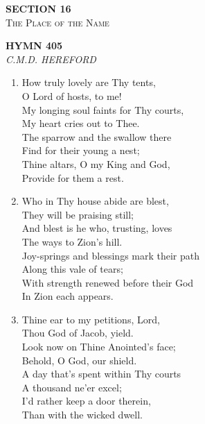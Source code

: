 \newpage
\thispagestyle{empty}
\vspace*{3.5cm}
\begin{center}
    {\LARGE \textbf{SECTION 16}}\\[0.8em]
    {\Large \textsc{The Place of the Name}}
\end{center}
\vspace{3.5cm}

\newpage
\begin{center}
    {\Large \textbf{HYMN 405}}
    \\
    \textit{C.M.D. HEREFORD}
\end{center}
\vspace{1em}

\begin{enumerate}
    \item How truly lovely are Thy tents, \\
        O Lord of hosts, to me! \\
        My longing soul faints for Thy courts, \\
        My heart cries out to Thee. \\
        The sparrow and the swallow there \\
        Find for their young a nest; \\
        Thine altars, O my King and God, \\
        Provide for them a rest.

    \item Who in Thy house abide are blest, \\
        They will be praising still; \\
        And blest is he who, trusting, loves \\
        The ways to Zion's hill. \\
        Joy-springs and blessings mark their path \\
        Along this vale of tears; \\
        With strength renewed before their God \\
        In Zion each appears.

    \item Thine ear to my petitions, Lord, \\
        Thou God of Jacob, yield. \\
        Look now on Thine Anointed's face; \\
        Behold, O God, our shield. \\
        A day that's spent within Thy courts \\
        A thousand ne'er excel; \\
        I'd rather keep a door therein, \\
        Than with the wicked dwell.


\end{enumerate}
